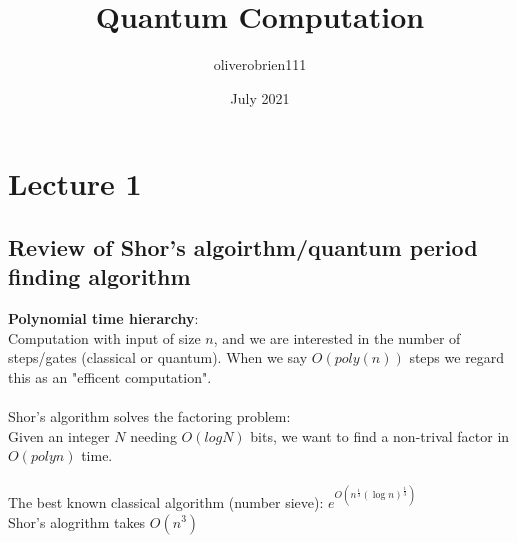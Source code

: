 \documentclass{article}
\title{Quantum Computation}
\author{oliverobrien111 }
\date{July 2021}
\begin{document}
\maketitle
\section{Lecture 1}
\subsection{Review of Shor's algoirthm/quantum period finding algorithm}
\textbf{Polynomial time hierarchy}:\\
Computation with input of size $n$, and we are interested in the number of steps/gates (classical or quantum). When we say $O(poly(n))$ steps we regard this as an "efficent computation".\\\\
Shor's algorithm solves the factoring problem:\\
Given an integer $N$ needing $O(log N)$ bits, we want to find a non-trival factor in $O(poly n)$ time.\\\\
The best known classical algorithm (number sieve): $e^{O(n^{\frac{1}{3}} (\log n)^{\frac{1}{3}} )}$\\
Shor's alogrithm takes $O(n^3)$\\
\end{document}

